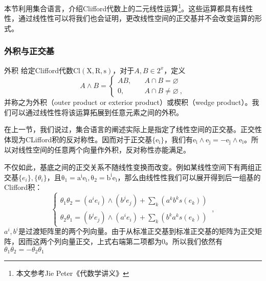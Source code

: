 

\begin{issues}
\issueTODO
\end{issues}

本节利用集合语言，介绍Clifford代数上的二元线性运算\footnote{本文参考Jie Peter《代数学讲义》}。这些运算都具有线性性，通过线性性可以将我们也会证明，更改线性空间的正交基并不会改变运算的形式。
\subsubsection{外积与正交基}
\begin{definition}{外积}
给定Clifford代数$\mathrm {Cl(X,R,s)}$，对于$A,B\in 2^x$，定义
\begin{equation}
A \wedge B=\left\{\begin{aligned}
A B,\quad& A \cap B=\varnothing \\
0,\quad& A \cap B \neq \varnothing~,
\end{aligned}\right.
\end{equation}
并称之为外积（outer product or exterior product）或楔积（wedge product）。我们可以通过线性性将该运算拓展到任意元素之间的外积。
\end{definition}

在上一节，我们说过，集合语言的阐述实际上是指定了线性空间的正交基。正交性体现为CLifford积的反对称性。因而对于正交基$\{\mathrm {e_i}\}$，我们有$\mathrm{e_i\wedge e_j=-e_j\wedge e_i}$。所以对线性空间的任意两个向量作外积，反对称性亦能满足。

不仅如此，基底之间的正交关系不随线性变换而改变。例如某线性空间下有两组正交基$\{e_i\},\{\theta_i\}$，且$\mathrm {\theta_1=a^ie_i,\theta_2=b^ie_i}$，那么由线性性我们可以展开得到后一组基的Clifford积：
\begin{equation}
\left\{\begin{array}{l}
\theta_1 \theta_2=\left(a^i e_i\right) \wedge\left(b^j e_j\right)+\sum_k\left(a^k b^k s(e_k)\right) \\
\theta_2 \theta_1=\left(b^j e_j\right) \wedge\left(a^i e_i\right)+\sum_k\left(b^k a^k s(e_k)\right)
\end{array}\right.~,
\end{equation}
$a^i,b^i$是过渡矩阵里的两个列向量。由于从标准正交基到标准正交基的矩阵为正交矩阵，因而这两个列向量正交，上式右端第二项都为0。所以我们依然有$\theta_1\theta_2=-\theta_2\theta_1$
